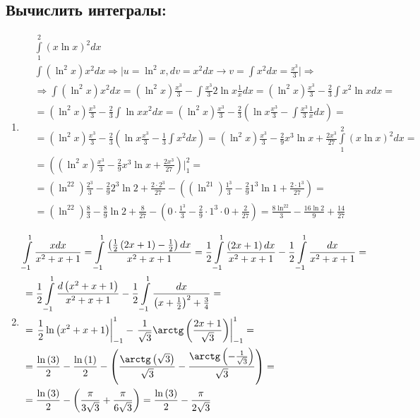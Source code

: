 \documentclass[a4paper, 12pt]{article}
\newcommand{\lr}[1]{\left({#1}\right)}
\begin{document}
\subsection{Вычислить интегралы:}
\begin{enumerate}
 \item %
 \begin{align*}
  &\int\limits_1^2 (x \ln x)^2 dx \\
  &\int (\ln^2x) x^2 dx \Rightarrow
  \Big|    u = \ln^2x, dv = x^2 dx \to v = \int x^2dx = \frac{x^3}{3}
  \Big| \Rightarrow \\ 
  &\Rightarrow \int (\ln^2x) x^2 dx = (\ln^2x)\frac{x^3}{3} - \int \frac{x^3}{3} 2 \ln x \frac{1}{x} dx = (\ln^2x)\frac{x^3}{3} - \frac{2}{3}\int x^2 \ln x dx = \\
  &= (\ln^2x)\frac{x^3}{3} - \frac{2}{3}\int \ln x x^2 dx = (\ln^2x)\frac{x^3}{3} -
  \frac{2}{3}(\ln x  \frac{x^3}{3} - \int \frac{x^3}{3} \frac{1}{x}dx) = \\
  &=  (\ln^2x)\frac{x^3}{3} - \frac{2}{3}(\ln x  \frac{x^3}{3} - \frac{1}{3}\int x^2 dx) = (\ln^2x)\frac{x^3}{3} - \frac{2}{9}x^3 \ln x + \frac{2x^3}{27} 
  \int\limits_1^2 (x \ln x)^2 dx = \\
  &= ((\ln^2x)\frac{x^3}{3} - \frac{2}{9}x^3 \ln x + \frac{2x^3}{27})\Big |_1^2 = \\
  &= (\ln^22)\frac{2^3}{3} - \frac{2}{9}2^3 \ln 2 + \frac{2 \cdot 2^3}{27} - ((\ln^21)\frac{1^3}{3} - \frac{2}{9}1^3 \ln 1 + \frac{2 \cdot 1^3}{27})=  \\
  &= (\ln^22)\frac{8}{3} - \frac{8}{9} \ln 2 + \frac{8}{27} - (0 \cdot \frac{1^3}{3} - \frac{2}{9}\cdot 1^3 \cdot 0 + \frac{2}{27})=  \frac{8 \ln^22}{3} - \frac{16 \ln 2}{9} + \frac{14}{27}
 \end{align*}

 \item %
 \begin{align*}
    &{\int\limits_{-1}^1 \frac{xdx}{x^2+x+1}} = \int\limits_{-1}^1 \frac{\lr{\frac{1}{2}\lr{2x+1} - \frac{1}{2}}dx}{x^2+x+1} =\frac{1}{2}\int\limits_{-1}^1 \frac{\lr{2x+1}dx}{x^2+x+1} - \frac{1}{2}\int\limits_{-1}^1 \frac{dx}{x^2+x+1} = \\
    &= \frac{1}{2}\int\limits_{-1}^1 \frac{d\lr{x^2+x+1}}{x^2+x+1} - \frac{1}{2}\int\limits_{-1}^1 \frac{dx}{\lr{x+\frac{1}{2}}^2+\frac{3}{4}}= \\
    &= \left.\frac{1}{2}\ln\lr{x^2+x+1}\right|^1_{-1} - \left.\frac{1}{\sqrt{3}}\arctg \lr{\frac{2x+1}{\sqrt{3}}}\right|^1_{-1} =\\
    &= \frac{\ln\lr{3}}{2} - \frac{\ln\lr{1}}{2} - \lr{\frac{\arctg \lr{\sqrt{3}}}{\sqrt{3}}- \frac{\arctg \lr{-\frac{1}{\sqrt{3}}}}{\sqrt{3}}}=\\
    &= \frac{\ln\lr{3}}{2} - \lr{\frac{\pi}{3\sqrt{3}}+ \frac{\pi}{6\sqrt{3}}}={\frac{\ln\lr{3}}{2} - \frac{\pi}{2\sqrt{3}}}
\end{align*} 


\end{enumerate}
\end{document}
